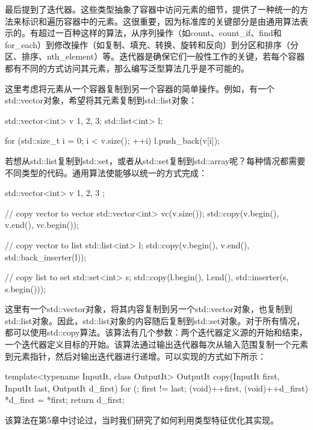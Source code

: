 最后提到了迭代器。这些类型抽象了容器中访问元素的细节，提供了一种统一的方法来标识和遍历容器中的元素。这很重要，因为标准库的关键部分是由通用算法表示的。有超过一百种这样的算法，从序列操作（如count、count\_if、find和for\_each）到修改操作（如复制、填充、转换、旋转和反向）到分区和排序（分区、排序、nth\_element）等。迭代器是确保它们一般性工作的关键，若每个容器都有不同的方式访问其元素，那么编写泛型算法几乎是不可能的。

这里考虑将元素从一个容器复制到另一个容器的简单操作。例如，有一个std::vector对象，希望将其元素复制到std::list对象：

\begin{cpp}
std::vector<int> v {1, 2, 3};
std::list<int> l;

for (std::size_t i = 0; i < v.size(); ++i)
	l.push_back(v[i]);
\end{cpp}

若想从std::list复制到std::set，或者从std::set复制到std::array呢？每种情况都需要不同类型的代码。通用算法使能够以统一的方式完成：

\begin{cpp}
std::vector<int> v{ 1, 2, 3 };

// copy vector to vector
std::vector<int> vc(v.size());
std::copy(v.begin(), v.end(), vc.begin());

// copy vector to list
std::list<int> l;
std::copy(v.begin(), v.end(), std::back_inserter(l));

// copy list to set
std::set<int> s;
std::copy(l.begin(), l.end(), std::inserter(s, s.begin()));
\end{cpp}

这里有一个std::vector对象，将其内容复制到另一个std::vector对象，也复制到std::list对象。因此，std::list对象的内容随后复制到std::set对象。对于所有情况，都可以使用std::copy算法。该算法有几个参数：两个迭代器定义源的开始和结束，一个迭代器定义目标的开始。该算法通过输出迭代器每次从输入范围复制一个元素到元素指针，然后对输出迭代器进行递增。可以实现的方式如下所示：

\begin{cpp}
template<typename InputIt, class OutputIt>
OutputIt copy(InputIt first, InputIt last,
			  OutputIt d_first)
{
	for (; first != last; (void)++first, (void)++d_first)
	{
		*d_first = *first;
	}
	return d_first;
}
\end{cpp}

\begin{important}
该算法在第5章中讨论过，当时我们研究了如何利用类型特征优化其实现。
\end{important}


